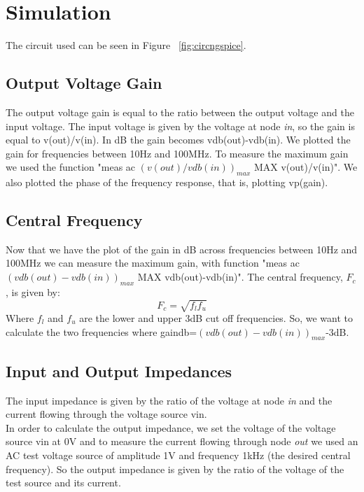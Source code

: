 \section{Simulation}
\label{sec:sim}
The circuit used can be seen in Figure ~\ref{fig:circngspice}. 
\subsection{Output Voltage Gain}
The output voltage gain is equal to the ratio between the output voltage and the input voltage. The input voltage is given by the voltage at node \textit{in}, so the gain is equal to v(out)/v(in). In dB the gain becomes vdb(out)-vdb(in). We plotted the gain for frequencies between 10Hz and 100MHz. To measure the maximum gain we used the function "meas ac $(v(out)/vdb(in))_{max}$ MAX v(out)/v(in)". We also plotted the phase of the frequency response, that is, plotting vp(gain).
\subsection{Central Frequency}
Now that we have the plot of the gain in dB across frequencies between 10Hz and 100MHz we can measure the maximum gain, with function "meas ac $(vdb(out)-vdb(in))_{max}$ MAX vdb(out)-vdb(in)". The central frequency, $F_c$, is given by:
\begin{equation}
F_c=\sqrt{f_lf_u}
\end{equation}
Where $f_l$ and $f_u$ are the lower and upper 3dB cut off frequencies. So, we want to calculate the two frequencies where gaindb=$(vdb(out)-vdb(in))_{max}$-3dB. 
\subsection{Input and Output Impedances}
The input impedance is given by the ratio of the voltage at node \textit{in} and the current flowing through the voltage source vin. \\
In order to calculate the output impedance, we set the voltage of the voltage source vin at 0V and to measure the current flowing through node \textit{out} we used an AC test voltage source of amplitude 1V and frequency 1kHz (the desired central frequency). So the output impedance is given by the ratio of the voltage of the test source and its current.
